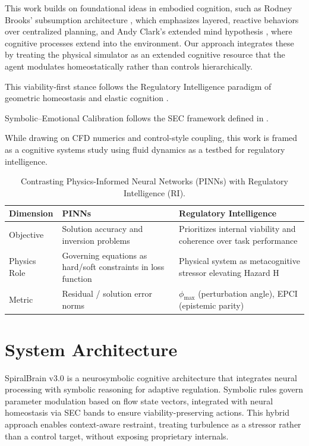 \documentclass[12pt,a4paper]{article}
\begin{document}
This work builds on foundational ideas in embodied cognition, such as Rodney Brooks' subsumption architecture \cite{Brooks1991}, which emphasizes layered, reactive behaviors over centralized planning, and Andy Clark's extended mind hypothesis \cite{Clark1998}, where cognitive processes extend into the environment. Our approach integrates these by treating the physical simulator as an extended cognitive resource that the agent modulates homeostatically rather than controls hierarchically.

This viability-first stance follows the Regulatory Intelligence paradigm of geometric homeostasis and elastic cognition \cite{Cragin2026RI}.

Symbolic–Emotional Calibration follows the SEC framework defined in \cite{Cragin2026SEC}.

While drawing on CFD numerics and control-style coupling, this work is framed as a cognitive systems study using fluid dynamics as a testbed for regulatory intelligence.

\begin{table}[htbp]
\centering
\caption{Contrasting Physics-Informed Neural Networks (PINNs) with Regulatory Intelligence (RI).}
\label{tab:contrast}
\begin{tabular}{@{} p{4.5cm} p{5cm} p{5.5cm} @{}}
\toprule
\textbf{Dimension} & \textbf{PINNs} & \textbf{Regulatory Intelligence} \\
\midrule
Objective          & Solution accuracy and inversion problems & Prioritizes internal viability and coherence over task performance \\
Physics Role       & Governing equations as hard/soft constraints in loss function & Physical system as metacognitive stressor elevating Hazard H \\
Metric             & Residual / solution error norms & $\phi_{\max}$ (perturbation angle), EPCI (epistemic parity) \\
\bottomrule
\end{tabular}
\end{table}

\section{System Architecture}

SpiralBrain v3.0 is a neurosymbolic cognitive architecture that integrates neural processing with symbolic reasoning for adaptive regulation. Symbolic rules govern parameter modulation based on flow state vectors, integrated with neural homeostasis via SEC bands to ensure viability-preserving actions. This hybrid approach enables context-aware restraint, treating turbulence as a stressor rather than a control target, without exposing proprietary internals.
\end{document}
